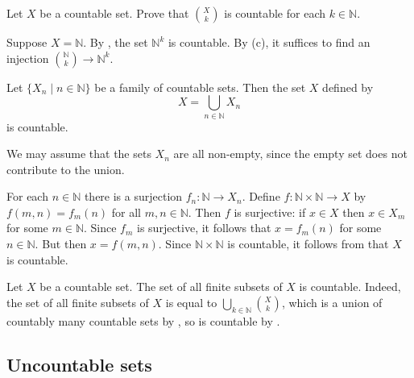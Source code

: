 
\begin{exercise} \label{exFiniteSubsetsCountableFixedSize}
Let $X$ be a countable set. Prove that $\binom{X}{k}$ is countable for each $k \in \mathbb{N}$.
\begin{backhint}
Suppose $X=\mathbb{N}$. By , the set $\mathbb{N}^k$ is countable. By (c), it suffices to find an injection $\binom{\mathbb{N}}{k} \to \mathbb{N}^k$.
\end{backhint}
\end{exercise}

\begin{theorem}
\label{thmCountableUnionOfCountableSetIsCountable}
Let $\{ X_n \mid n \in \mathbb{N} \}$ be a family of countable sets. Then the set $X$ defined by
\[ X = \bigcup_{n \in \mathbb{N}} X_n \]
is countable.
\end{theorem}

\begin{cproof}
We may assume that the sets $X_n$ are all non-empty, since the empty set does not contribute to the union.

For each $n \in \mathbb{N}$ there is a surjection $f_n : \mathbb{N} \to X_n$. Define $f : \mathbb{N} \times \mathbb{N} \to X$ by $f(m,n)=f_m(n)$ for all $m,n \in \mathbb{N}$. Then $f$ is surjective: if $x \in X$ then $x \in X_m$ for some $m \in \mathbb{N}$. Since $f_m$ is surjective, it follows that $x=f_m(n)$ for some $n \in \mathbb{N}$. But then $x=f(m,n)$. Since $\mathbb{N} \times \mathbb{N}$ is countable, it follows from  that $X$ is countable.
\end{cproof}

\begin{example}
\label{exCountableSubsetsOfCountableSetIsCountable}
Let $X$ be a countable set. The set of all finite subsets of $X$ is countable. Indeed, the set of all finite subsets of $X$ is equal to $\displaystyle \bigcup_{k \in \mathbb{N}} \binom{X}{k}$, which is a union of countably many countable sets by , so is countable by .
\end{example}

\subsection*{Uncountable sets}

